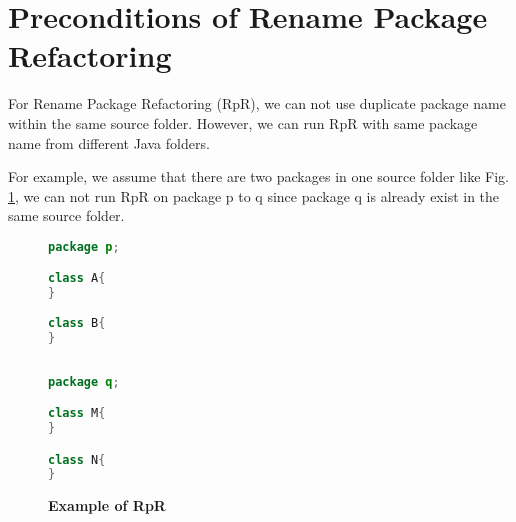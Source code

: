  \section{\textbf{Preconditions of Rename Package Refactoring}}

For Rename Package Refactoring (RpR), we can not use duplicate package name within the same source folder. However, we can run RpR with same package name from different Java folders.

For example, we assume that there are two packages in one source folder like Fig. \ref{fig:RpR}, we can not run RpR on package p to q since package q is already exist in the same source folder. 

\begin{figure}[th]
\centering
\begin{minipage}[t]{0.45\linewidth}
\begin{lstlisting}[language=java, basicstyle=\scriptsize\ttfamily,frame=single]
package p;

class A{
}
	
class B{
}
 
\end{lstlisting}
\end{minipage}
\hfill
\begin{minipage}[t]{0.45\linewidth}
\begin{lstlisting}[language=java, basicstyle=\scriptsize\ttfamily,frame=single]
package q;

class M{
}	

class N{
}


\end{lstlisting}
\end{minipage}
\caption{\textbf{Example of RpR}}
\label{fig:RpR}
\end{figure}